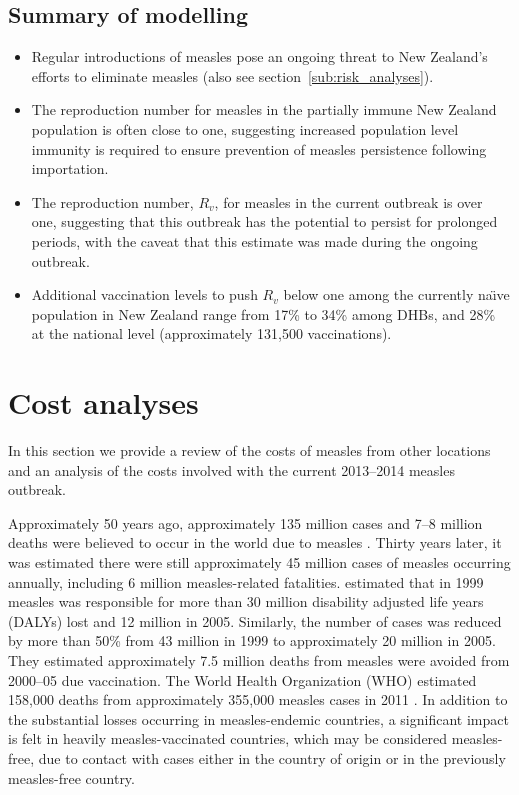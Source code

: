 \documentclass{article}
\begin{document}
\begin{itemize}
\subsection{Summary of modelling}
\begin{itemize}
\item Regular introductions of measles pose an ongoing threat to New Zealand's efforts to eliminate measles (also see section~\ref{sub:risk_analyses}).
\item The reproduction number for measles in the partially immune New Zealand population is often close to one, suggesting increased population level immunity is required to ensure prevention of measles persistence following importation.
 \item The reproduction number, $R_v$, for measles in the current outbreak is over one, suggesting that this outbreak has the potential to persist for prolonged periods, with the caveat that this estimate was made during the ongoing outbreak.
 \item Additional vaccination levels to push $R_v$ below one among the currently na\"{\i}ve population in New Zealand range from 17\% to 34\% among DHBs, and 28\% at the national level (approximately 131,500 vaccinations).
\end{itemize}

\section{Cost analyses}

In this section we provide a review of the costs of measles from other locations and an analysis of the costs involved with the current 2013--2014 measles outbreak.

Approximately 50 years ago, approximately 135 million cases and 7--8 million deaths were believed to occur in the world due to measles \citep{clements4}. Thirty years later, it was estimated there were still approximately 45 million cases of measles occurring annually, including 6 million measles-related fatalities. \citep{wolfson7} estimated that in 1999 measles was responsible for more than 30 million disability adjusted life years (DALYs) lost and 12 million in 2005. Similarly, the number of cases was reduced by more than 50\% from 43 million in 1999 to approximately 20 million in 2005. They estimated approximately 7.5 million deaths from measles were avoided from 2000--05 due vaccination. The World Health Organization (WHO) estimated 158,000 deaths from approximately 355,000 measles cases in 2011 \citep{who13}.  In addition to the substantial losses occurring in measles-endemic countries, a significant impact is felt in heavily measles-vaccinated countries, which may be considered measles-free, due to contact with cases either in the country of origin or in the previously measles-free country.


\end{itemize}
\end{document}
